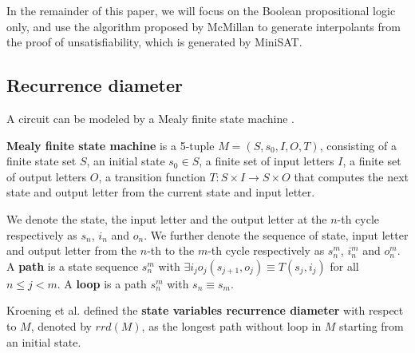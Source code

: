 \documentclass{sig-alternate}
\begin{document}
In the remainder of this paper,
we will focus on the Boolean propositional logic only,
and use the algorithm proposed by McMillan\cite{interp_McMillan} to generate interpolants from the proof of unsatisfiability,
which is generated by MiniSAT\cite{EXTSAT}.

\subsection{Recurrence diameter}

A circuit can be modeled by a Mealy finite state machine \cite{MEALY}.

\begin{definition11}\label{MealyFSM_old}%
\textbf{Mealy finite state machine} is a 5-tuple $M=(S,s_0,I,O,T)$,
consisting of a finite state set $S$,
an initial state $s_0\in S$,
a finite set of input letters $I$,
a finite set of output letters $O$,
a transition function $T: S\times I\to S\times O$ that computes the next state and output letter from the current state and input letter.
\end{definition11}

We denote the state, the input letter and the output letter at the $n$-th cycle respectively as $s_n$, $i_n$ and $o_n$.
We further denote the sequence of state, input letter and output letter from the $n$-th to the $m$-th cycle respectively as $s_n^m$, $i_n^m$ and $o_n^m$.
A \textbf{path} is a state sequence $s_n^{m}$ with $\exists i_jo_j (s_{j+1},o_j)\equiv T(s_j,i_j)$ for all $n\le j< m$.
A \textbf{loop} is a path $s_n^{m}$ with $s_n\equiv s_m$.

Kroening et al. \cite{RecDiam} defined the \textbf{state variables recurrence diameter} with respect to $M$,
denoted by $rrd(M)$,
as the longest path without loop in $M$ starting from an initial state.

\end{document}
